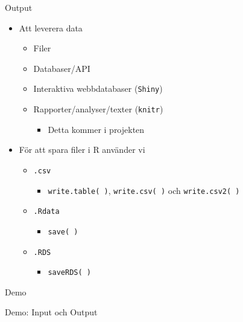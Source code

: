 \documentclass[
  11pt,
  ignorenonframetext,
]{beamer}
\providecommand{\tightlist}{%
  \setlength{\itemsep}{0pt}\setlength{\parskip}{0pt}}
\begin{document}
\begin{frame}{Output}
\label{output}
\begin{itemize}
\tightlist
\item
  Att leverera data

  \begin{itemize}
  \tightlist
  \item
    Filer
  \item
    Databaser/API
  \item
    Interaktiva webbdatabaser (\texttt{Shiny})
  \item
    Rapporter/analyser/texter (\texttt{knitr})

    \begin{itemize}
    \tightlist
    \item
      Detta kommer i projekten
    \end{itemize}
  \end{itemize}
\end{itemize}

\pause

\begin{itemize}
\tightlist
\item
  För att spara filer i R använder vi

  \begin{itemize}
  \tightlist
  \item
    \texttt{.csv}

    \begin{itemize}
    \tightlist
    \item
      \texttt{write.table( )}, \texttt{write.csv( )} och
      \texttt{write.csv2( )}
    \end{itemize}
  \item
    \texttt{.Rdata}

    \begin{itemize}
    \tightlist
    \item
      \texttt{save( )}
    \end{itemize}
  \item
    \texttt{.RDS}

    \begin{itemize}
    \tightlist
    \item
      \texttt{saveRDS( )}
    \end{itemize}
  \end{itemize}
\end{itemize}
\end{frame}

\begin{frame}{Demo}
\label{demo-4}
\begin{block}{Demo: Input och Output}
\label{demo-input-och-output}
\end{block}
\end{frame}
\end{document}
